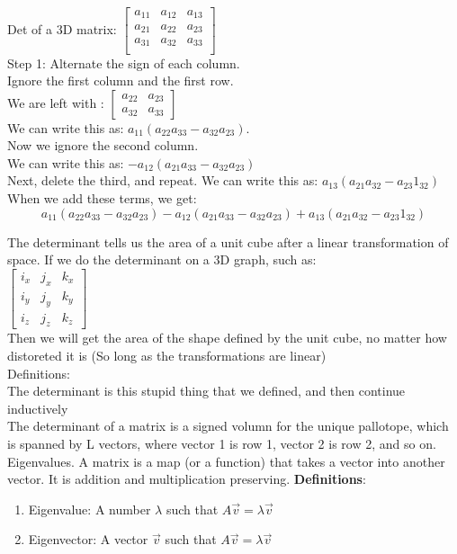 \documentclass[]{article}
\begin{document}
    Det of a 3D matrix:
    $
    \begin{bmatrix}
        a_{11} & a_{12} & a_{13}\\
        a_{21} & a_{22} & a_{23}\\
        a_{31} & a_{32} & a_{33}\\
    \end{bmatrix}$\\
    Step 1: Alternate the sign of each column.\\
    Ignore the first column and the first row.\\
    We are left with : $\begin{bmatrix}
        a_{22} & a_{23}\\
a_{32} & a_{33}
    \end{bmatrix}$\\
    We can write this as: $a_{11} (a_{22}a_{33}-a_{32}a_{23})$.\\
    Now we ignore the second column.\\
    We can write this as: $-a_{12}(a_{21}a_{33}-a_{32}a_{23})$\\
    Next, delete the third, and repeat.
    We can write this as: $a_{13}(a_{21}a_{32}-a_{23}1_{32})$\\
    When we add these terms, we get: 
    \begin{equation*}
        a_{11} (a_{22}a_{33}-a_{32}a_{23})-a_{12}(a_{21}a_{33}-a_{32}a_{23})+a_{13}(a_{21}a_{32}-a_{23}1_{32})
    \end{equation*}

    The determinant tells us the area of a unit cube after a linear transformation of space.
    If we do the determinant on a 3D graph, such as:\\
    $\begin{bmatrix}
        i_x & j_x &k_x\\
        i_y & j_y & k_y\\
        i_z & j_z & k_z
    \end{bmatrix}$\\
    Then we will get the area of the shape defined by the unit cube, no matter how distoreted it is (So long as the transformations are linear)\\
    Definitions:\\The determinant is this stupid thing that we defined, and then continue inductively\\
    The determinant of a matrix is a signed volumn for the unique pallotope, which is spanned by L vectors, where vector 1 is row 1, vector 2 is row 2, and so on.\\
    Eigenvalues. A matrix is a map (or a function) that takes a vector into another vector. It is addition and multiplication preserving.
    \textbf{Definitions}:
    \begin{enumerate}
        \item Eigenvalue: A number $\lambda$ such that $A\vec{v} = \lambda \vec{v}$
        \item Eigenvector: A vector $\vec{v}$ such that $A\vec{v} = \lambda \vec{v}$
    \end{enumerate}
\end{document}
